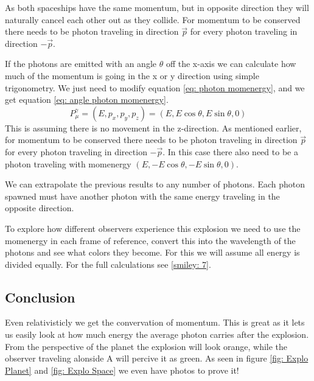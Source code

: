 \documentclass[reprint,english,notitlepage]{revtex4-2}
\begin{document}
  
  As both spaceships have the same momentum, but in opposite direction they will naturally cancel each other out as they collide. For momentum to be conserved there needs to be photon traveling in direction $ \vec{p} $ for every photon traveling in direction $ - \vec{p} $. 
  
  If the photons are emitted with an angle $ θ $ off the x-axis we can calculate how much of the momentum is going in the x or y direction using simple trigonometry. 
  We just need to modify equation \ref{eq: photon momenergy}, and we get equation \ref{eq: angle photon momenergy}.
  \begin{equation}\label{eq: angle photon momenergy}
    P_{μ}^{γ} =  (E, p_{x}, p_{y}, p_{z}) = (E, E \cos θ, E \sin θ, 0)
  \end{equation}
  This is assuming there is no movement in the z-direction. As mentioned earlier, for momentum to be conserved there needs to be photon traveling in direction $ \vec{p} $ for every photon traveling in direction $ - \vec{p} $. In this case there also need to be a photon traveling with momenergy $  (E, -E\cos θ, -E \sin θ, 0)  $.
  
  We can extrapolate the previous results to any number of photons. Each photon spawned must have another photon with the same energy traveling in the opposite direction.  
  
  To explore how different observers experience this explosion we need to use the momenergy in each frame of reference, convert this into the wavelength of the photons and see what colors they become. For this we will assume all energy is divided equally. For the full calculations see \ref{smiley: 7}.
  
  
  \subsection{Conclusion} 
  Even relativisticly we get the convervation of momentum. This is great as it lets us easily look at how much energy the average photon carries after the explosion. From the perspective of the planet the explosion will look orange, while the observer traveling alonside A will percive it as green. As seen in figure \ref{fig: Explo Planet} and \ref{fig: Explo Space} we even have photos to prove it!
  
\end{document}
